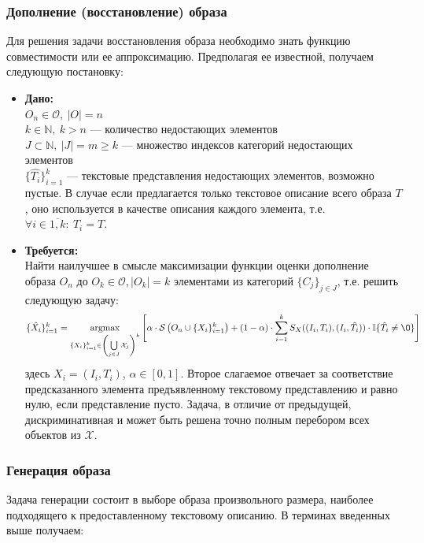 \documentclass[a4paper,12pt]{article}
\DeclareMathOperator*{\argmax}{argmax}
\begin{document}
			\subsubsection{Дополнение (восстановление) образа}
				Для решения задачи восстановления образа необходимо знать функцию совместимости или ее аппроксимацию. Предполагая ее известной, получаем следующую постановку:
				\begin{itemize}
					\item \textbf{Дано:}\\
					$O_n\in\mathcal{O}, ~|O| = n$ \\
					$k \in \mathbb{N}, ~k> n$ --- количество недостающих элементов\\
					$J\subset\mathbb{N},~|J| = m\geqslant k$ --- множество индексов категорий недостающих элементов\\
					$\{\hat{T_i}\}_{i=1}^k$ --- текстовые представления недостающих элементов, возможно пустые. В случае если предлагается только текстовое описание всего образа $T$, оно используется в качестве описания каждого элемента, т.е. $\forall i \in \overline{1,k}: ~T_i = T$.
					
					\item \textbf{Требуется:}\\
					Найти наилучшее в смысле максимизации функции оценки дополнение образа $O_n$ до $O_k\in\mathcal{O}, |O_k|=k$ элементами из категорий $\{C_j\}_{j\in J}$, т.е. решить следующую задачу:
					$$\{\hat{X_i}\}_{i=1}^k= \argmax_{\{X_i\}_{i=1}^k\in\left(\bigcup\limits_{j\in J}\mathcal{X}_j\right)^k} \left[\alpha \cdot \mathcal{S}\left(O_n\cup\{X_i\}_{i=1}^k\right) + (1-\alpha) \cdot \sum\limits_{i=1}^k S_X((I_i, T_i), (I_i, \hat{T_i}))\cdot\mathbb{I}\{\hat{T_i}\neq\O\}  \right]$$				
					здесь $X_i = (I_i, T_i)$, $\alpha\in[0,1]$. Второе слагаемое отвечает за соответствие предсказанного элемента предъявленному текстовому представлению и равно нулю, если представление пусто. Задача, в отличие от предыдущей, дискриминативная и  может быть решена точно полным перебором всех объектов из $\mathcal{X}$.
				\end{itemize}
			
			\subsubsection{Генерация образа}
				Задача генерации состоит в выборе образа произвольного размера, наиболее подходящего к предоставленному текстовому описанию. В терминах введенных выше получаем:
			
\end{document}
